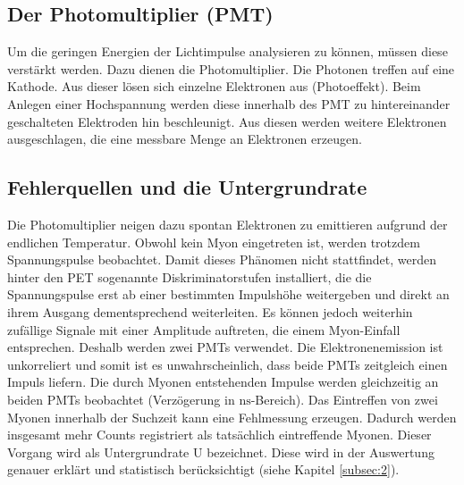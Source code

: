 \subsection{Der Photomultiplier (PMT)}
\label{sec:PMT}
Um die geringen Energien der Lichtimpulse analysieren zu können, müssen diese verstärkt werden. Dazu dienen die Photomultiplier. Die Photonen treffen auf eine Kathode. Aus dieser lösen sich einzelne Elektronen aus (Photoeffekt). Beim Anlegen einer Hochspannung werden diese innerhalb des PMT zu hintereinander geschalteten Elektroden hin beschleunigt. Aus diesen werden weitere Elektronen ausgeschlagen, die eine messbare Menge an Elektronen erzeugen. 

\subsection{Fehlerquellen und die Untergrundrate}
\label{sec:Untergrundrate}
Die Photomultiplier neigen dazu spontan Elektronen zu emittieren aufgrund der endlichen Temperatur. Obwohl kein Myon eingetreten ist, werden trotzdem Spannungspulse beobachtet. \newline 
\noindent Damit dieses Phänomen nicht stattfindet, werden hinter den PET sogenannte  Diskriminatorstufen installiert, die die Spannungspulse erst ab einer bestimmten Impulshöhe weitergeben und direkt an ihrem Ausgang dementsprechend weiterleiten. Es können jedoch weiterhin zufällige Signale mit einer Amplitude auftreten, die einem Myon-Einfall entsprechen. Deshalb werden zwei PMTs verwendet. Die Elektronenemission ist unkorreliert und somit ist es unwahrscheinlich, dass beide PMTs zeitgleich einen Impuls liefern. Die durch Myonen entstehenden Impulse werden gleichzeitig an beiden PMTs beobachtet (Verzögerung in $\mathrm{ns}$-Bereich). \newline
\noindent Das Eintreffen von zwei Myonen innerhalb der Suchzeit kann eine Fehlmessung erzeugen. Dadurch werden insgesamt mehr Counts registriert als tatsächlich eintreffende Myonen. Dieser Vorgang wird als Untergrundrate U bezeichnet. Diese wird in der Auswertung genauer erklärt und statistisch berücksichtigt (siehe Kapitel \ref{subsec:2}).

